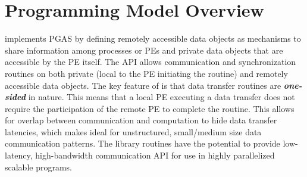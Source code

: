\section{Programming Model Overview}
\openshmem implements \ac{PGAS} by defining remotely accessible data objects as mechanisms to share information among \openshmem processes or \acp{PE} and private data objects that are accessible by the \ac{PE} itself. The \ac{API} allows communication and synchronization routines on both private (local to the PE initiating the routine) and remotely accessible data objects. The key feature of \openshmem is that data transfer routines are \textit{\textbf{one-sided}} in nature. This means that a local \ac{PE} executing a data transfer does not require the participation of the remote \ac{PE} to complete the routine. This allows for overlap between communication and computation to hide data transfer latencies, which makes  \openshmem ideal for unstructured, small/medium size data communication patterns. The \openshmem library routines have the potential to provide low-latency, high-bandwidth communication \ac{API} for use in highly parallelized scalable programs.  


